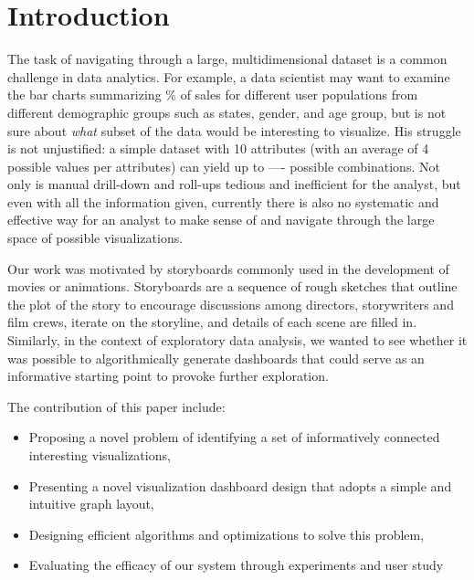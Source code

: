 \newpage
\section{Introduction}
\par The task of navigating through a large, multidimensional dataset is a common challenge in data analytics. For example, a data scientist may want to examine the bar charts summarizing \% of sales for different user populations from different demographic groups such as states, gender, and age group, but is not sure about \textit{what} subset of the data would be interesting to visualize. His struggle is not unjustified: a simple dataset with 10 attributes (with an average of 4 possible values per attributes) can yield up to ---- possible combinations. Not only is manual drill-down and roll-ups tedious and inefficient for the analyst, but even with all the information given, currently there is also no systematic and effective way for an analyst to make sense of and navigate through the large space of possible visualizations. 
\par Our work was motivated by storyboards commonly used in the development of movies or animations. Storyboards are a sequence of rough sketches that outline the plot of the story to encourage discussions among directors, storywriters and film crews, iterate on the storyline, and details of each scene are filled in. Similarly, in the context of exploratory data analysis, we wanted to see whether it was possible to algorithmically generate dashboards that could serve as an informative starting point to provoke further exploration.
\par <discuss spurious correlation, paradoxes, motivate why its important to look at visualizations within context>

\par The contribution of this paper include: 
\begin{itemize}
\item Proposing a novel problem of identifying a set of informatively connected interesting visualizations,
\item Presenting a novel visualization dashboard design that adopts a simple and intuitive graph layout,
\item Designing efficient algorithms and optimizations to solve this problem,  
\item Evaluating the efficacy of our system through experiments and user study
\end{itemize}